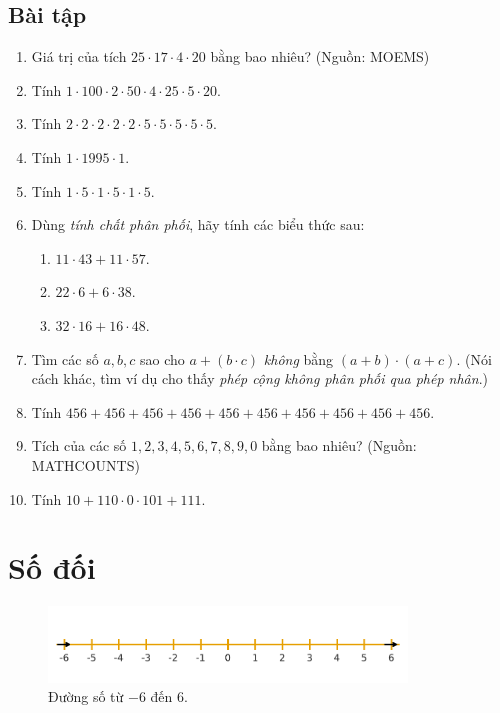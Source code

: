 \subsection*{Bài tập}

\begin{enumerate}[label=1.3.\arabic*.]
  \item Giá trị của tích \(25\cdot17\cdot4\cdot20\) bằng bao nhiêu?
        \hfill\small(Nguồn: MOEMS)
  \item Tính \(1\cdot100\cdot2\cdot50\cdot4\cdot25\cdot5\cdot20\).
  \item Tính \(2\cdot2\cdot2\cdot2\cdot2\cdot5\cdot5\cdot5\cdot5\cdot5\).
  \item Tính \(1\cdot1995\cdot1\).
  \item Tính \(1\cdot5\cdot1\cdot5\cdot1\cdot5\).
  \item Dùng \emph{tính chất phân phối}, hãy tính các biểu thức sau:
    \begin{enumerate}[label=(\alph*)]
      \item \(11\cdot43 + 11\cdot57\).
      \item \(22\cdot6 + 6\cdot38\).
      \item \(32\cdot16 + 16\cdot48\).
    \end{enumerate}
  \item Tìm các số \(a,b,c\) sao cho \(a+(b\cdot c)\) \emph{không} bằng
        \((a+b)\cdot(a+c)\).
        (Nói cách khác, tìm ví dụ cho thấy \emph{phép cộng không phân phối
        qua phép nhân}.)
  \item Tính \(456+456+456+456+456+456+456+456+456+456\).
  \item Tích của các số \(1,2,3,4,5,6,7,8,9,0\) bằng bao nhiêu?
        \hfill\small(Nguồn: MATHCOUNTS)
  \item Tính \(10+110\cdot0\cdot101+111\).
\end{enumerate}


\section{Số đối}

\begin{figure}[ht!]
  \centering
  \includegraphics[width=0.85\textwidth]{img/fig-numberline.pdf}
  \caption*{\small Đường số từ $-6$ đến $6$.}
\end{figure}

